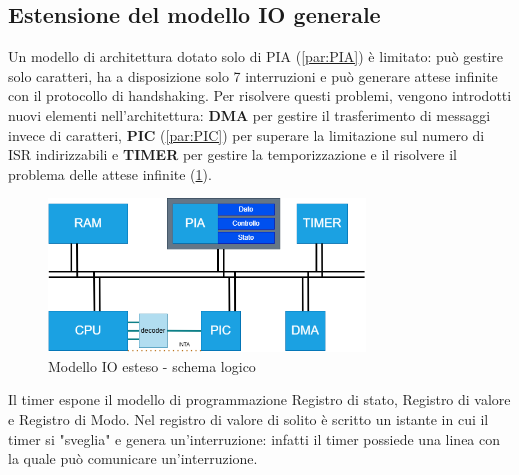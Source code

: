 \subsection{Estensione del modello IO generale}
Un modello di architettura dotato solo di PIA (\ref{par:PIA}) è limitato: può gestire solo caratteri, ha a disposizione solo 7 interruzioni e può generare attese infinite con il protocollo di handshaking.
Per risolvere questi problemi, vengono introdotti nuovi elementi nell'architettura: \textbf{DMA} per gestire il trasferimento di messaggi invece di caratteri, \textbf{PIC} (\ref{par:PIC}) per superare la limitazione sul numero di ISR indirizzabili e \textbf{TIMER} per gestire la temporizzazione e il risolvere il problema delle attese infinite (\ref{img:IO_ESTESO}).

\begin{figure}[ht]
    \centering
    \includegraphics[width=0.75\textwidth]{img/Schema_IO_1.png}
    \caption{Modello IO esteso - schema logico}
    \label{img:IO_ESTESO}
\end{figure}

Il timer espone il modello di programmazione Registro di stato, Registro di valore e Registro di Modo. Nel registro di valore di solito è scritto un istante in cui il timer si "sveglia" e genera un'interruzione: infatti il timer possiede una linea con la quale può comunicare un'interruzione.

